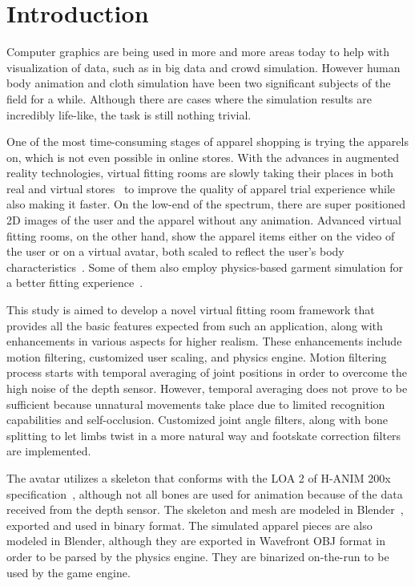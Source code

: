 \chapter{Introduction}
\label{chapter_introduction}

Computer graphics are being used in more and more areas today to help with visualization of data, such as in big data and crowd simulation. However human body animation and cloth simulation have been two significant subjects of the field for a while. Although there are cases where the simulation results are incredibly life-like, the task is still nothing trivial. 

One of the most time-consuming stages of apparel shopping is trying the apparels on, which is not even possible in online stores. With the advances in augmented reality technologies, virtual fitting rooms are slowly taking their places in both real and virtual stores~\cite{Fitnect2012,Styku2013} to improve the quality of apparel trial experience while also making it faster. On the low-end of the spectrum, there are super positioned 2D images of the user and the apparel without any animation. Advanced virtual fitting rooms, on the other hand, show the apparel items either on the video of the user or on a virtual avatar, both scaled to reflect the user's body characteristics~\cite{FaceCake2013}. Some of them also employ physics-based garment simulation for a better fitting experience~\cite{Styku2013}.

This study is aimed to develop a novel virtual fitting room framework that provides all the basic features expected from such an application, along with enhancements in various aspects for higher realism. These enhancements include motion filtering, customized user scaling, and physics engine. Motion filtering process starts with temporal averaging of joint positions in order to overcome the high noise of the depth sensor. However, temporal averaging does not prove to be sufficient because unnatural movements take place due to limited recognition capabilities and self-occlusion. Customized joint angle filters, along with bone splitting to let limbs twist in a more natural way and footskate correction filters are implemented.

The avatar utilizes a skeleton that conforms with the LOA 2 of H-ANIM 200x specification~\cite{HANIM}, although not all bones are used for animation because of the data received from the depth sensor. The skeleton and mesh are modeled in Blender~\cite{Blender}, exported and used in binary format. The simulated apparel pieces are also modeled in Blender, although they are exported in Wavefront OBJ format in order to be parsed by the physics engine. They are binarized on-the-run to be used by the game engine. 

